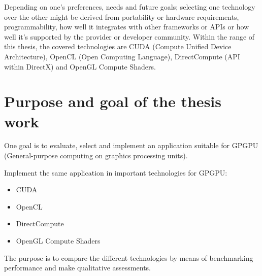Depending on one's preferences, needs and future goals; selecting one technology over the other might be derived from portability or hardware requirements, programmability, how well it integrates with other frameworks or APIs or how well it's supported by the provider or developer community. Within the range of this thesis, the covered technologies are CUDA (Compute Unified Device Architecture), OpenCL (Open Computing Language), DirectCompute (API within DirectX) and OpenGL Compute Shaders.

\section{Purpose and goal of the thesis work}
One goal is to evaluate, select and implement an application suitable for GPGPU (General-purpose computing on graphics processing units).

Implement the same application in important technologies for GPGPU:
\begin{itemize}
	\item CUDA
	\item OpenCL
	\item DirectCompute
	\item OpenGL Compute Shaders
\end{itemize}

The purpose is to compare the different technologies by means of benchmarking performance and make qualitative assessments.